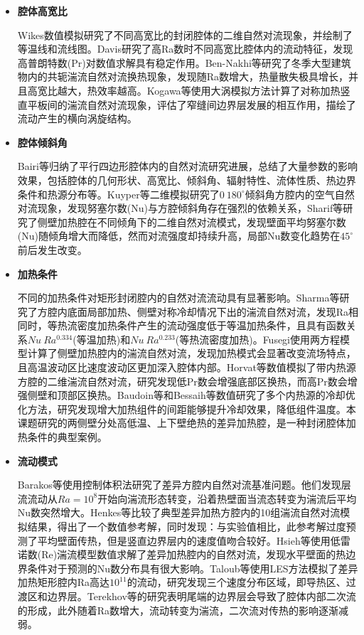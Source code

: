 \documentclass[UTF8]{article} %
\begin{document}
\begin{itemize}
    \item \textbf{腔体高宽比}
    
    Wikes\cite{RN3}数值模拟研究了不同高宽比的封闭腔体的二维自然对流现象，并绘制了等温线和流线图。Davis\cite{RN4}研究了高Ra数时不同高宽比腔体内的流动特征，发现高普朗特数(Pr)对数值求解具有稳定作用。Ben-Nakhi等研究了冬季大型建筑物内的共轭湍流自然对流换热现象，发现随Ra数增大，热量散失极具增长，并且高宽比越大，热效率越高。Kogawa\cite{RN5}等使用大涡模拟方法计算了对称加热竖直平板间的湍流自然对流现象，评估了窄缝间边界层发展的相互作用，描绘了流动产生的横向涡旋结构。
    
    \item \textbf{腔体倾斜角}
    
    Bairi等归纳了平行四边形腔体内的自然对流研究进展，总结了大量参数的影响效果，包括腔体的几何形状、高宽比、倾斜角、辐射特性、流体性质、热边界条件和热源分布等。Kuyper\cite{RN6}等二维模拟研究了$0~180^\circ$倾斜角方腔内的空气自然对流现象，发现努塞尔数(Nu)与方腔倾斜角存在强烈的依赖关系，Sharif等研究了侧壁加热腔在不同倾角下的二维自然对流模式，发现壁面平均努塞尔数(Nu)随倾角增大而降低，然而对流强度却持续升高，局部Nu数变化趋势在$45^\circ$前后发生改变。
    
    \item \textbf{加热条件}
    
    不同的加热条件对矩形封闭腔内的自然对流流动具有显著影响。Sharma\cite{RN7}等研究了方腔内底面局部加热、侧壁对称冷却情况下出的湍流自然对流，发现Ra相同时，等热流密度加热条件产生的流动强度低于等温加热条件，且具有函数关系$Nu~Ra^{0.334}$(等温加热)和$Nu~Ra^{0.233}$(等热流密度加热)。Fusegi使用两方程模型计算了侧壁加热腔内的湍流自然对流，发现加热模式会显著改变流场特点，且高温波动区比速度波动区更加深入腔体内部。Horvat等数值模拟了带内热源方腔的二维湍流自然对流，研究发现低Pr数会增强底部区换热，而高Pr数会增强侧壁和顶部区换热。Baudoin等和Bessaih等数值研究了多个内热源的冷却优化方法，研究发现增大加热组件的间距能够提升冷却效果，降低组件温度。本课题研究的两侧壁分处高低温、上下壁绝热的差异加热腔，是一种封闭腔体加热条件的典型案例。
   
    \item \textbf{流动模式}
    
    Barakos\cite{RN8}等使用控制体积法研究了差异方腔内自然对流基准问题。他们发现层流流动从$Ra=10^8$开始向湍流形态转变，沿着热壁面当流态转变为湍流后平均Nu数突然增大。Henkes等比较了典型差异加热方腔内的10组湍流自然对流模拟结果，得出了一个数值参考解，同时发现：与实验值相比，此参考解过度预测了平均壁面传热，但是竖直边界层内的速度值吻合较好。Hsieh等使用低雷诺数(Re)湍流模型数值求解了差异加热腔内的自然对流，发现水平壁面的热边界条件对于预测的Nu数分布具有很大影响。Taloub等使用LES方法模拟了差异加热矩形腔内Ra高达$10^{11}$的流动，研究发现三个速度分布区域，即导热区、过渡区和边界层。Terekhov等的研究表明尾端的边界层会导致了腔体内部二次流的形成，此外随着Ra数增大，流动转变为湍流，二次流对传热的影响逐渐减弱。
    

\end{itemize}
\end{document}
